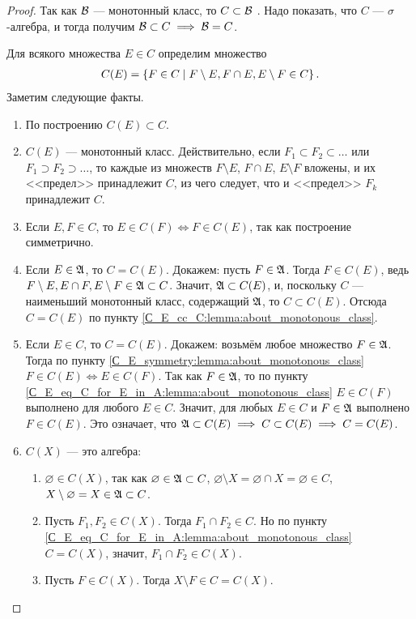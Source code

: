 \begin{proof}
 Так как $\mathcal{B}$  --- монотонный класс, то $C \subset \mathcal{B}$ . Надо показать, что $C$  --- $\sigma$-алгебра, и тогда получим $\mathcal{B} \subset C \implies \mathcal{B} = C$.

 Для всякого множества $E \in C$ определим множество
\begin{align*}
C(E) = \left\{ F \in C \;\middle|\; F \setminus E, F \cap E, E \setminus F \in C \right\}
.\end{align*} Заметим следующие факты.
 \begin{enumerate}
  \item По построению $C(E) \subset C$.
   \label{С_E_cc_C:lemma:about_monotonous_class}
  \item $C(E)$ --- монотонный класс. Действительно, если $F_1 \subset F_2 \subset \ldots$ или $F_1 \supset F_2 \supset \ldots$, то каждые из множеств $F \setminus E$, $F \cap E$, $E \setminus F$ вложены, и их <<предел>> принадлежит $C$, из чего следует, что и <<предел>> $F_k$ принадлежит $C$.
  \item Если $E, F \in C$, то $E \in C(F) \iff F \in C(E)$, так как построение симметрично.
   \label{С_E_symmetry:lemma:about_monotonous_class}
  \item Если $E \in \mathfrak{A}$, то $C = C(E)$. Докажем: пусть $F \in \mathfrak{A}$. Тогда $F \in C(E)$, ведь $F \setminus E, E \cap F, E \setminus F \in \mathfrak{A} \subset C$. Значит, $\mathfrak{A} \subset C(E)$, и, поскольку $C$ --- наименьший монотонный класс, содержащий $\mathfrak{A}$, то $C \subset C(E)$. Отсюда $C = C(E)$ по пункту \ref{С_E_cc_C:lemma:about_monotonous_class}.
   \label{С_E_eq_C_for_E_in_A:lemma:about_monotonous_class}
  \item Если $E \in C$, то $C = C(E)$. Докажем: возьмём любое множество $F \in \mathfrak{A}$. Тогда по пункту \ref{С_E_symmetry:lemma:about_monotonous_class} $F \in C(E) \iff E \in C(F)$. Так как $F \in \mathfrak{A}$, то по пункту \ref{С_E_eq_C_for_E_in_A:lemma:about_monotonous_class} $E \in C(F)$ выполнено для любого $E \in C$. Значит, для любых $E \in C$ и $F \in \mathfrak{A}$ выполнено $F \in C(E)$. Это означает, что $\mathfrak{A} \subset C(E) \implies C \subset C(E) \implies C = C(E)$.
  \item $C(X)$ --- это алгебра:
   \begin{enumerate}
    \item $\varnothing \in C(X)$, так как $\varnothing \in \mathfrak{A} \subset C$, $\varnothing \setminus X = \varnothing \cap X = \varnothing \in C$, $X \setminus \varnothing = X \in \mathfrak{A} \subset C$.
    \item Пусть $F_1, F_2 \in C(X)$. Тогда $F_1 \cap F_2 \in C$. Но по пункту \ref{С_E_eq_C_for_E_in_A:lemma:about_monotonous_class} $C = C(X)$, значит, $F_1 \cap F_2 \in C(X)$.
    \item Пусть $F \in C(X)$. Тогда $X \setminus F \in C = C(X)$.
   \end{enumerate}
   \label{С_E_is_algebra:lemma:about_monotonous_class}
 \end{enumerate}


\end{proof}
